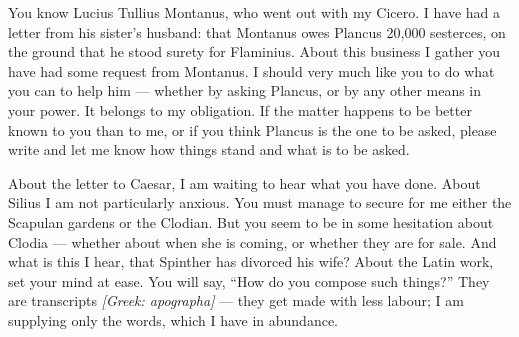 

 You know Lucius Tullius Montanus, who went out with my Cicero. I have had a letter from his sister's husband: that Montanus owes Plancus 20{,}000 sesterces, on the ground that he stood surety for Flaminius. About this business I gather you have had some request from Montanus. I should very much like you to do what you can to help him --- whether by asking Plancus, or by any other means in your power. It belongs to my obligation. If the matter happens to be better known to you than to me, or if you think Plancus is the one to be asked, please write and let me know how things stand and what is to be asked.

 About the letter to Caesar, I am waiting to hear what you have done. About Silius I am not particularly anxious. You must manage to secure for me either the Scapulan gardens or the Clodian. But you seem to be in some hesitation about Clodia --- whether about when she is coming, or whether they are for sale. And what is this I hear, that Spinther has divorced his wife? About the Latin work, set your mind at ease. You will say, ``How do you compose such things?'' They are transcripts \textit{[Greek: apographa]} --- they get made with less labour; I am supplying only the words, which I have in abundance.
